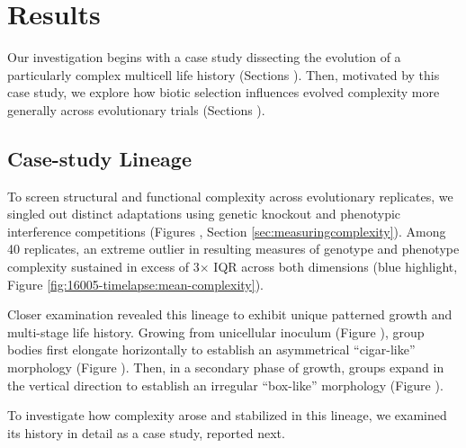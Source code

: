 





\section{Results}

Our investigation begins with a case study dissecting the evolution of a particularly complex multicell life history (Sections ).
Then, motivated by this case study, we explore how biotic selection influences evolved complexity more generally across evolutionary trials (Sections ).

\subsection{Case-study Lineage}
\label{sec:case-study-lineage}

To screen structural and functional complexity across evolutionary replicates, we singled out distinct adaptations using genetic knockout and phenotypic interference competitions (Figures , Section \ref{sec:measuringcomplexity}).
Among 40 replicates, an extreme outlier in resulting measures of genotype and phenotype complexity sustained in excess of 3$\times$ IQR across both dimensions (blue highlight, Figure \ref{fig:16005-timelapse:mean-complexity}).

Closer examination revealed this lineage to exhibit unique patterned growth and multi-stage life history.
Growing from unicellular inoculum (Figure ), group bodies first elongate horizontally to establish an asymmetrical ``cigar-like'' morphology (Figure ).
Then, in a secondary phase of growth, groups expand in the vertical direction to establish an irregular ``box-like'' morphology (Figure ).

To investigate how complexity arose and stabilized in this lineage, we examined its history in detail as a case study, reported next.


